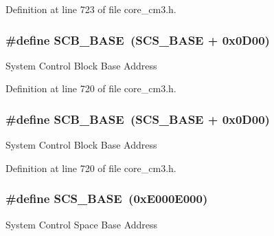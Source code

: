 Definition at line 723 of file core\+\_\+cm3.\+h.

\subsubsection[{\texorpdfstring{S\+C\+B\+\_\+\+B\+A\+SE}{SCB_BASE}}]{\setlength{\rightskip}{0pt plus 5cm}\#define S\+C\+B\+\_\+\+B\+A\+SE~({\bf S\+C\+S\+\_\+\+B\+A\+SE} +  0x0\+D00)}\hypertarget{group___c_m_s_i_s___c_m3__core__register_gad55a7ddb8d4b2398b0c1cfec76c0d9fd}{}\label{group___c_m_s_i_s___c_m3__core__register_gad55a7ddb8d4b2398b0c1cfec76c0d9fd}
System Control Block Base Address 

Definition at line 720 of file core\+\_\+cm3.\+h.

\subsubsection[{\texorpdfstring{S\+C\+B\+\_\+\+B\+A\+SE}{SCB_BASE}}]{\setlength{\rightskip}{0pt plus 5cm}\#define S\+C\+B\+\_\+\+B\+A\+SE~({\bf S\+C\+S\+\_\+\+B\+A\+SE} +  0x0\+D00)}\hypertarget{group___c_m_s_i_s___c_m3__core__register_gad55a7ddb8d4b2398b0c1cfec76c0d9fd}{}\label{group___c_m_s_i_s___c_m3__core__register_gad55a7ddb8d4b2398b0c1cfec76c0d9fd}
System Control Block Base Address 

Definition at line 720 of file core\+\_\+cm3.\+h.

\subsubsection[{\texorpdfstring{S\+C\+S\+\_\+\+B\+A\+SE}{SCS_BASE}}]{\setlength{\rightskip}{0pt plus 5cm}\#define S\+C\+S\+\_\+\+B\+A\+SE~(0x\+E000\+E000)}\hypertarget{group___c_m_s_i_s___c_m3__core__register_ga3c14ed93192c8d9143322bbf77ebf770}{}\label{group___c_m_s_i_s___c_m3__core__register_ga3c14ed93192c8d9143322bbf77ebf770}
System Control Space Base Address 

